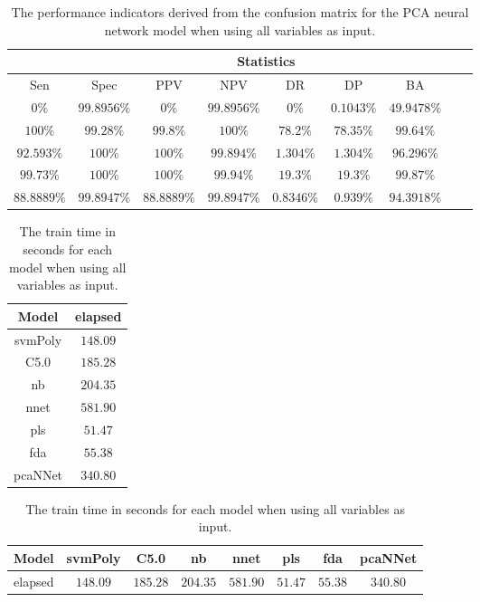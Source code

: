 \begin{table}[!ht]
	\centering
	\begin{tabular}{|c|c|c|c|c|c|c|c|c|}
		\hline
		 & \multicolumn{7}{c|}{Statistics} \\ \hline
		Sen & Spec & PPV & NPV & DR & DP & BA \\ \hline
		$0\%$ & $99.8956\%$ & $0\%$ & $99.8956\%$ & $0\%$ & $0.1043\%$ & $49.9478\%$ \\ \hline
		$100\%$ & $99.28\%$ & $99.8\%$ & $100\%$ & $78.2\%$ & $78.35\%$ & $99.64\%$ \\ \hline
		$92.593\%$ & $100\%$ & $100\%$ & $99.894\%$ & $1.304\%$ & $1.304\%$ & $96.296\%$ \\ \hline
		$99.73\%$ & $100\%$ & $100\%$ & $99.94\%$ & $19.3\%$ & $19.3\%$ & $99.87\%$ \\ \hline
		$88.8889\%$ & $99.8947\%$ & $88.8889\%$ & $99.8947\%$ & $0.8346\%$ & $0.939\%$ & $94.3918\%$ \\ \hline
	\end{tabular}
	\caption{The performance indicators derived from the confusion matrix for the PCA neural network model when using all variables as input.}
	\label{tab:cs:all:pcaNNet}
\end{table}

\begin{table}[!ht]
	\centering
	\begin{tabular}{|c|c|}
		\hline
		Model & elapsed \\ \hline
		svmPoly & $148.09$ \\ \hline
		C5.0 & $185.28$ \\ \hline
		nb & $204.35$ \\ \hline
		nnet & $581.90$ \\ \hline
		pls & $51.47$ \\ \hline
		fda & $55.38$ \\ \hline
		pcaNNet & $340.80$ \\ \hline
	\end{tabular}
	\caption{The train time in seconds for each model when using all variables as input.}
	\label{tab:time:all:train}
\end{table}

\begin{table}[!ht]
	\centering
	\begin{tabular}{|c|c|c|c|c|c|c|c|}
		\hline
		Model & svmPoly & C5.0 & nb & nnet & pls & fda & pcaNNet \\ \hline
		elapsed & $148.09$ & $185.28$ & $204.35$ & $581.90$ & $51.47$ & $55.38$ & $340.80$ \\ \hline
	\end{tabular}
	\caption{The train time in seconds for each model when using all variables as input.}
	\label{tab:time:reverse:all:train}
\end{table}

